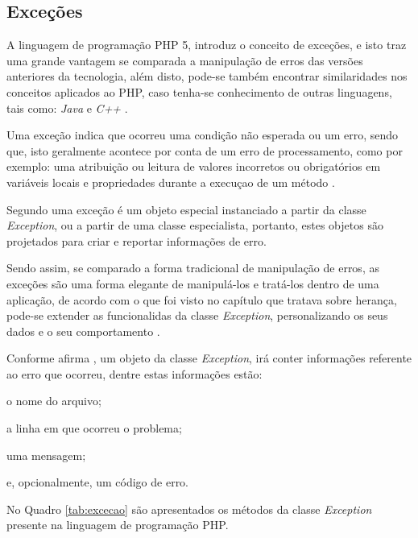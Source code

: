 \subsection{Exceções}

A linguagem de programação \acs{PHP} 5, introduz o conceito de exceções, e isto traz
uma grande vantagem se comparada a manipulação de erros das versões anteriores
da tecnologia, além disto, pode-se também encontrar similaridades nos
conceitos aplicados ao \acs{PHP}, caso tenha-se conhecimento de outras
linguagens, tais como: \textit{Java} e \textit{C++} \cite{phpObjectsPatternsAndPractice}.

Uma exceção indica que ocorreu uma condição não esperada ou um erro, sendo que,
isto geralmente acontece por conta de um erro de processamento, como por
exemplo: uma atribuição ou leitura de valores incorretos ou obrigatórios em
variáveis locais e propriedades durante a execuçao de um método \cite{learningJava}.

Segundo  uma exceção é um objeto
especial instanciado a partir da classe \textit{Exception}, ou a partir de uma
classe especialista, portanto, estes objetos são projetados para criar e
reportar informações de erro.

Sendo assim, se comparado a forma tradicional de manipulação de erros, as
exceções são uma forma elegante de manipulá-los e tratá-los dentro de uma
aplicação, de acordo com o que foi visto no capítulo que
tratava sobre herança, pode-se extender as funcionalidas da classe
\textit{Exception}, personalizando os seus dados e o seu comportamento \cite{phpMasterWriteCuttingEdgeCode}.

Conforme afirma , um objeto da classe
\textit{Exception}, irá conter informações referente ao erro que ocorreu, dentre
estas informações estão:

\begin{alineas}
    \item o nome do arquivo;
    \item a linha em que ocorreu o problema;
    \item uma mensagem;
    \item e, opcionalmente, um código de erro.
\end{alineas}

No Quadro \ref{tab:excecao} são apresentados os métodos da classe
\textit{Exception} presente na linguagem de programação \acs{PHP}.


